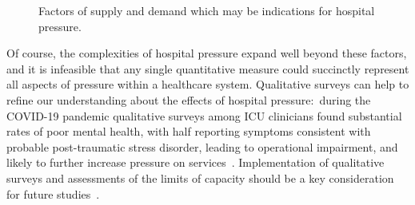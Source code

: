 \begin{figure}[htbp!]
  \centering
  \caption[Factors of supply and demand which may be indications for hospital pressure]{Factors of supply and demand which may be indications for hospital pressure.}\label{fig:hospital-pressure}
\end{figure}

Of course, the complexities of hospital pressure expand well beyond these factors, and it is infeasible that any single quantitative measure could succinctly represent all aspects of pressure within a healthcare system. Qualitative surveys can help to refine our understanding about the effects of hospital pressure:\ during the COVID-19 pandemic qualitative surveys among ICU clinicians found substantial rates of poor mental health, with half reporting symptoms consistent with probable post-traumatic stress disorder, leading to operational impairment, and likely to further increase pressure on services~\parencite{Hall2022-ck, Greenberg2021-wc}. Implementation of qualitative surveys and assessments of the limits of capacity should be a key consideration for future studies~\parencite{Fong2024-hy}.

